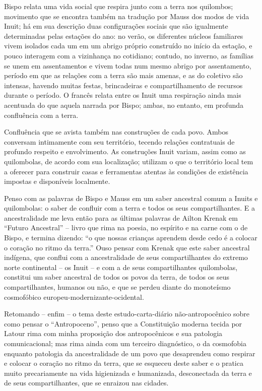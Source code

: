 Bispo relata uma vida social que respira junto com a terra nos quilombos; movimento que se encontra também na tradução por Mauss dos modos de vida Inuit; há em sua descrição duas configurações sociais que são igualmente determinadas pelas estações do ano: no verão, os diferentes núcleos familiares vivem isolados cada um em um abrigo próprio construído no início da estação, e pouco interagem com a vizinhança no cotidiano; contudo, no inverno, as famílias se unem em assentamentos e vivem todas num mesmo abrigo por assentamento, período em que as relações com a terra são mais amenas, e as do coletivo são intensas, havendo muitas festas, brincadeiras e compartilhamento de recursos durante o período. O francês relata entre os Inuit uma respiração ainda mais acentuada do que aquela narrada por Bispo; ambas, no entanto, em profunda confluência com a terra.

Confluência que se avista também nas construções de cada povo. Ambos conversam intimamente com seu território, tecendo relações contratuais de profundo respeito e envolvimento. As construções Inuit variam, assim como as quilombolas, de acordo com sua localização; utilizam o que o território local tem a oferecer para construir casas e ferramentas atentas às condições de existência impostas e disponíveis localmente.

Penso com as palavras de Bispo e Mauss em um saber ancestral comum a Inuits e quilombolas: o saber de confluir com a terra e todos os seus compartilhantes. E a ancestralidade me leva então para as últimas palavras de Ailton Krenak em \enquote{Futuro Ancestral} -- livro que rima na poesia, no espírito e na carne com o de Bispo, e termina dizendo: \enquote{o que nossas crianças aprendem desde cedo é a colocar o coração no ritmo da terra.} Ouso pensar com Krenak que este saber ancestral indígena, que conflui com a ancestralidade de seus compartilhantes do extremo norte continental -- os Inuit -- e com a de seus compartilhantes quilombolas, constitui um saber ancestral de todos os povos da terra, de todos os seus compartilhantes, humanos ou não, e que se perdeu diante do monoteísmo cosmofóbico europeu-modernizante-ocidental.

Retomando -- enfim -- o tema deste estudo-carta-diário não-antropocênico sobre como pensar o \enquote{Antropoceno}, penso que a Constituição moderna tecida por Latour rima com minha proposição dos antropocênicos e sua patologia comunicacional; mas rima ainda com um terceiro diagnóstico, o da cosmofobia enquanto patologia da ancestralidade de um povo que desaprendeu como respirar e colocar o coração no ritmo da terra, que se esqueceu deste saber e o pratica muito precariamente na vida higienizada e humanizada, desconectada da terra e de seus compartilhantes, que se enraizou nas cidades.

